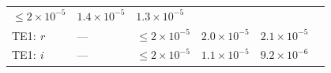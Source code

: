 \documentclass[DM,toc]{lsstdoc}
\begin{document}
\begin{longtable}[]{@{}llllll@{}}
\begin{minipage}[t]{0.14\columnwidth}
\(\leq 2\times10^{-5}\)\strut
\end{minipage} & \begin{minipage}[t]{0.12\columnwidth}\raggedright\strut
\(1.4\times10^{-5}\) \strut
\end{minipage} & \begin{minipage}[t]{0.12\columnwidth}\raggedright\strut
\(1.3\times10^{-5}\) \strut
\end{minipage} & \begin{minipage}[t]{0.17\columnwidth}\raggedright\strut
\strut
\end{minipage}\tabularnewline
\begin{minipage}[t]{0.12\columnwidth}\raggedright\strut
TE1: \emph{r}\strut
\end{minipage} & \begin{minipage}[t]{0.06\columnwidth}\raggedright\strut
---\strut
\end{minipage} & \begin{minipage}[t]{0.14\columnwidth}\raggedright\strut
\(\leq 2\times10^{-5}\)\strut
\end{minipage} & \begin{minipage}[t]{0.12\columnwidth}\raggedright\strut
\(2.0\times10^{-5}\)\strut
\end{minipage} & \begin{minipage}[t]{0.12\columnwidth}\raggedright\strut
\(2.1\times10^{-5}\)\strut
\end{minipage} & \begin{minipage}[t]{0.17\columnwidth}\raggedright\strut
\strut
\end{minipage}\tabularnewline
\begin{minipage}[t]{0.12\columnwidth}\raggedright\strut
TE1: \emph{i}\strut
\end{minipage} & \begin{minipage}[t]{0.06\columnwidth}\raggedright\strut
---\strut
\end{minipage} & \begin{minipage}[t]{0.14\columnwidth}\raggedright\strut
\(\leq 2\times10^{-5}\)\strut
\end{minipage} & \begin{minipage}[t]{0.12\columnwidth}\raggedright\strut
\(1.1\times10^{-5}\)\strut
\end{minipage} & \begin{minipage}[t]{0.12\columnwidth}\raggedright\strut
\(9.2\times10^{-6}\)\strut
\end{minipage} & \begin{minipage}[t]{0.17\columnwidth}\raggedright\strut

\end{minipage}
\end{longtable}
\end{document}
